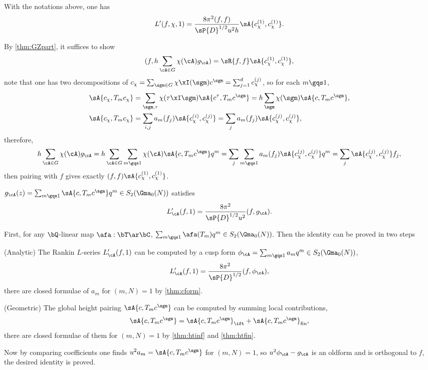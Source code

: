 \documentclass[article, a4paper, twoside]{universal}
\begin{document}
\begin{thm}[{\cite[I.6.3]{GZ1986}}]\label{thm:GZmain}
	With the notations above, one has
	\[
		L'(f,\chi,1)=\frac{8\pi^{2}(f,f)}{\sP{D}^{1/2}u^{2}h}\sA{c_{\chi}^{(1)},c_{\chi}^{(1)}}.
	\]
\end{thm}

\begin{prf}
	By \cref{thm:GZpart}, it suffices to show
	\[
		(f,h\sum_{\cA\in G}\chi(\cA)g_{\cA})=\sR{f,f}\sA{c_{\chi}^{(1)},c_{\chi}^{(1)}},
	\]
	note that one has two decompositions of $c_{\chi}=\sum_{\sgm\in G}\chi\xI(\sgm)c^{\sgm}=\sum_{j=1}^{d}c_{\chi}^{(j)}$, so for each $m\gqs1$,
	\begin{align*}
	  \sA{c_{\chi},T_{m}c_{\chi}} &= \sum_{\sgm,\tau}\chi(\tau\xI\sgm)\sA{c^{\tau},T_{m}c^{\sgm}} =h\sum_{\sgm}\chi(\sgm)\sA{c,T_{m}c^{\sgm}},\\
	  \sA{c_{\chi},T_{m}c_{\chi}} &= \sum_{i,j}a_{m}(f_{j})\sA{c_{\chi}^{(i)},c_{\chi}^{(j)}}=\sum_{j}a_{m}(f_{j})\sA{c_{\chi}^{(j)},c_{\chi}^{(j)}},
	\end{align*}
	therefore,
	\begin{align*}
	  h\sum_{\cA\in G}\chi(\cA)g_{\cA} = h\sum_{\cA\in G}\sum_{m\gqs1}\chi(\cA)\sA{c,T_{m}c^{\sgm}}q^{m} = \sum_{j}\sum_{m\gqs1}a_{m}(f_{j})\sA{c_{\chi}^{(j)},c_{\chi}^{(j)}}q^{m} = \sum_{j}\sA{c_{\chi}^{(j)},c_{\chi}^{(j)}}f_{j},
	\end{align*}
	then pairing with $f$ gives exactly $(f,f)\sA{c_{\chi}^{(1)},c_{\chi}^{(1)}}$.
\end{prf}

\begin{thm}[{\cite[I.6.1]{GZ1986}}]\label{thm:GZpart}
	$g_{\cA}(z)=\sum_{m\gqs1}\sA{c,T_{m}c^{\sgm}}q^{m}\in S_{2}(\Gma_{0}(N))$ satisfies
	\[
		L_{\cA}'(f,1)=\frac{8\pi^{2}}{\sP{D}^{1/2}u^{2}}(f,g_{\cA}).
	\]
\end{thm}

\begin{prf}
	First, for any $\bQ$-linear map $\afa:\bT\ar \bC$, $\sum_{m\gqs1}\afa(T_{m})q^{m}\in S_{2}(\Gma_{0}(N))$. Then the identity can be proved in two steps
	\begin{enr}
		\item (Analytic) The Rankin $L$-series $L_{\cA}'(f,1)$ can be computed by a cusp form $\phi_{\cA}=\sum_{m\gqs1}a_{m}q^{m}\in S_{2}(\Gma_{0}(N))$,
		\[
			L_{\cA}'(f,1)=\frac{8\pi^{2}}{\sP{D}^{1/2}}(f,\phi_{\cA}),
		\]
		there are closed formulae of $a_{m}$ for $(m,N)=1$ by \cref{thm:cform}.
		\item (Geometric) The global height pairing $\sA{c,T_{m}c^{\sgm}}$ can be computed by summing local contributions,
		\[
			\sA{c,T_{m}c^{\sgm}}=\sA{c,T_{m}c^{\sgm}}_{\ift}+\sA{c,T_{m}c^{\sgm}}_{\text{fin}},
		\]
		there are closed formulae of them for $(m,N)=1$ by \cref{thm:htinf} and \cref{thm:htfin}.

	\end{enr}
	Now by comparing coefficients one finds $u^{2}a_{m}=\sA{c,T_{m}c^{\sgm}}$ for $(m,N)=1$, so $u^{2}\phi_{\cA}-g_{\cA}$ is an oldform and is orthogonal to $f$, the desired identity is proved.
\end{prf}
\end{document}
